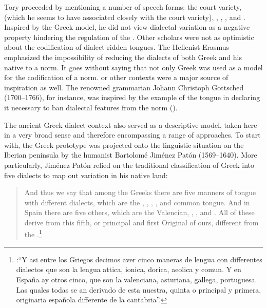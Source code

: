 Tory proceeded by mentioning a number of  speech forms: the court variety,  (which he seems to have associated closely with the court variety), , , , and . Inspired by the Greek model, he did not view dialectal variation as a negative property hindering the regulation of the . Other scholars were not as optimistic about the codification of dialect-ridden tongues. The Hellenist Erasmus \citet[239]{Schmidt1615} emphasized the impossibility of reducing the dialects of both Greek and his native  to a norm. It goes without saying that not only Greek was used as a model for the codification of a norm.  or other  contexts were a major source of inspiration as well. The renowned grammarian Johann Christoph Gottsched (1700–1766), for instance, was inspired by the example of the  tongue in declaring it necessary to ban dialectal features from the  norm (\citeyear[334]{Gottsched1748}).

The ancient Greek dialect context also served as a descriptive model, taken here in a very broad sense and therefore encompassing a range of approaches. To start with, the Greek prototype was projected onto the linguistic situation on the Iberian peninsula by the  humanist Bartolomé Jiménez Patón (1569–1640). More particularly, Jiménez Patón relied on the traditional classification of Greek into five dialects to map out variation in his native land:

\begin{quote}
And thus we say that among the Greeks there are five manners of tongue with different dialects, which are the , , , , and common tongue. And in Spain there are five others, which are the Valencian, , , and . All of these derive from this fifth, or principal and first Original  of ours, different from the .\footnote{\citet[10\textsc{\textsuperscript{r}}\textsc{–10}\textsc{\textsuperscript{v}}]{Jimenez1604}:“Y asi entre los Griegos decimos aver cinco maneras de lengua con differentes dialectos que son la lengua attica, ionica, dorica, aeolica y comun. Y en España ay otros cinco, que son la valenciana, asturiana, gallega, portuguesa. Las quales todas se an derivado de esta nuestra, quinta o principal y primera, originaria española differente de la cantabria”.}
\end{quote}

